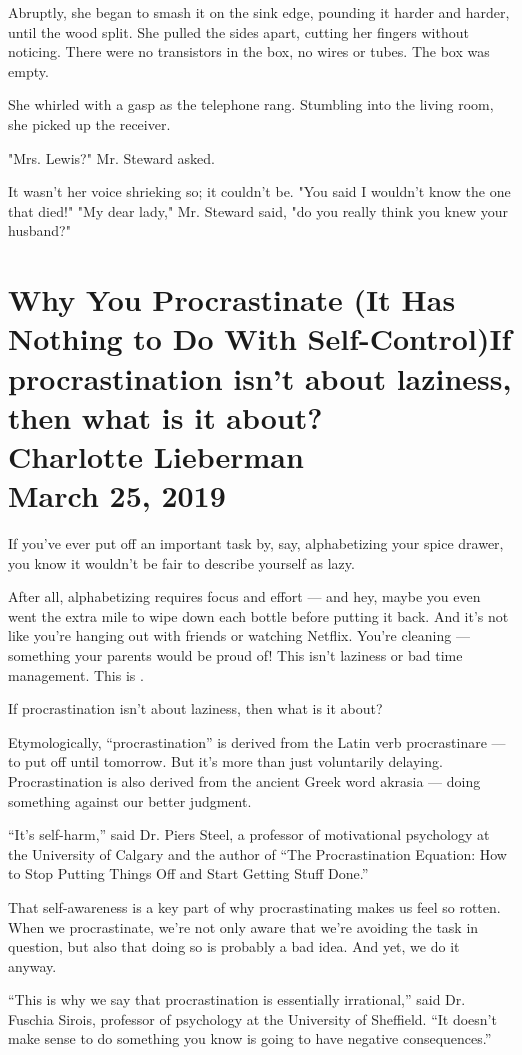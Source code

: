 \documentclass[10pt,a4paper]{book}
\newcommand{\glos}[3]{\dotuline{#1}\marginpar{\scriptsize\textit{#3} #2}}
\newcommand{\subtitle}[1]{\vspace{10pt}\newline\normalsize\plantin #1}
\newcommand{\newentry}[3]{
		\begingroup
		\chapter*{
		\nolinenumbers
		\plantinc\color{hgblue} #1\\\Large\normalfont\color{black} #2\\\normalsize #3
		}
		\endgroup
	}
\begin{document}
Abruptly, she began to smash it on the sink edge, pounding it harder and harder, until the wood split. She pulled the sides apart, cutting her fingers without noticing. There were no transistors in the box, no wires or tubes. The box was empty.

She whirled with a gasp as the telephone rang. Stumbling into the living room, she picked up the receiver.

"Mrs. Lewis?" Mr. Steward asked.

It wasn't her voice shrieking so; it couldn't be. "You said I wouldn't know the one that died!" "My dear lady," Mr. Steward said, "do you really think you knew your husband?"


\newentry{Why You Procrastinate (It Has Nothing to Do With Self-Control)\subtitle{If procrastination isn’t about laziness, then what is it about?}}{Charlotte Lieberman}{March 25, 2019}
\noindent If you’ve ever put off an important task by, say, alphabetizing your spice drawer, you know it wouldn’t be fair to describe yourself as lazy.

After all, alphabetizing requires focus and effort — and hey, maybe you even went the extra mile to wipe down each bottle before putting it back. And it’s not like you’re hanging out with friends or watching Netflix. You’re cleaning — something your parents would be proud of! This isn’t laziness or bad time management. This is \glos{procrastination}{overspringshandlen}{sb.}.

If procrastination isn’t about laziness, then what is it about?

Etymologically, “procrastination” is derived from the Latin verb procrastinare — to put off until tomorrow. But it’s more than just voluntarily delaying. Procrastination is also derived from the ancient Greek word akrasia — doing something against our better judgment.

“It’s self-harm,” said Dr. Piers Steel, a professor of motivational psychology at the University of Calgary and the author of “The Procrastination Equation: How to Stop Putting Things Off and Start Getting Stuff Done.”

That self-awareness is a key part of why procrastinating makes us feel so rotten. When we procrastinate, we’re not only aware that we’re avoiding the task in question, but also that doing so is probably a bad idea. And yet, we do it anyway.

“This is why we say that procrastination is essentially irrational,” said Dr. Fuschia Sirois, professor of psychology at the University of Sheffield. “It doesn’t make sense to do something you know is going to have negative consequences.”
\end{document}
